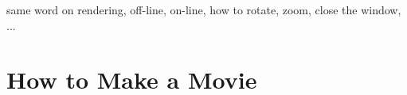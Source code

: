 

same word on rendering, off-line, on-line, how to rotate, zoom, close the window, ...

\section{How to Make a Movie}
